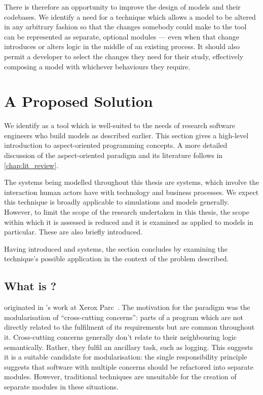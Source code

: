 There is therefore an opportunity to improve the design of models and their
codebases. We identify a need for a technique which allows a model to be altered
in any arbitrary fashion so that the changes somebody could make to the tool can
be represented as separate, optional modules --- even when that change
introduces or alters logic in the middle of an existing process. It should also
permit a developer to select the changes they need for their study, effectively
composing a model with whichever behaviours they require.



\section{A Proposed Solution}
We identify \aop{} as a tool which is well-suited to the
needs of research software engineers who build models as described earlier. This
section gives a high-level introduction to aspect-oriented programming concepts.
A more detailed discussion of the aspect-oriented
paradigm and its literature follows in \cref{chap:lit_review}.

The systems being modelled throughout this thesis are \sociotechnical systems,
which involve the interaction human actors have with technology and business
processes. We expect this technique is broadly applicable to simulations and
models generally. However, to limit the scope of the research undertaken in this
thesis, the scope within which it is assessed is reduced and it is examined as
applied to \sociotechnical models in particular. These are also briefly
introduced.

Having introduced \aop{} and \sociotechnical systems, the
section concludes by examining the technique's possible application in the
context of the problem described.





\subsection{What is \AOP{}?}

\Aop{} originated in \citeauthor{kiczales1997aspect}'s work
at Xerox Parc~\cite{kiczales1997aspect}. The motivation for the paradigm was the
modularisation of ``cross-cutting concerns'': parts of a program which are not
directly related to the fulfilment of its requirements but are common throughout
it. Cross-cutting concerns generally don't relate to their neighbouring logic
semantically. Rather, they fulfil an ancillary task, such as logging. This
suggests it is a suitable candidate for modularisation: the single
responsibility principle~\cite{martin2003singleresponsibility} suggests that
software with multiple concerns should be refactored into separate modules.
However, traditional techniques are unsuitable for the creation of separate
modules in these situations.

